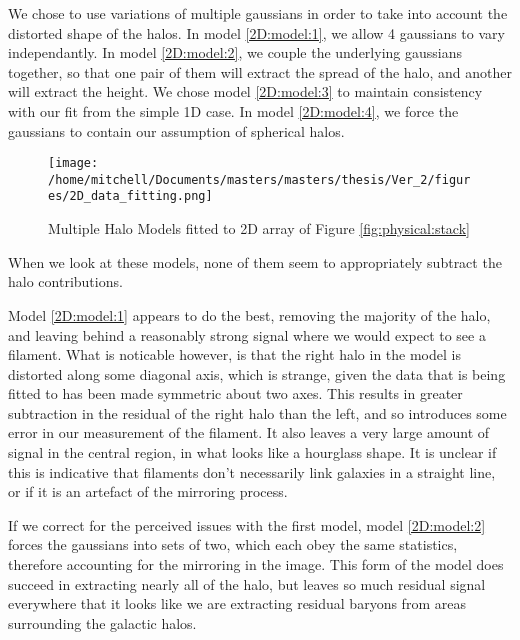 We chose to use variations of multiple gaussians in order to take into account the distorted shape of the halos. In model \ref{2D:model:1}, we allow 4 gaussians to vary independantly. In model \ref{2D:model:2}, we couple the underlying gaussians together, so that one pair of them will extract the spread of the halo, and another will extract the height. We chose model \ref{2D:model:3} to maintain consistency with our fit from the simple 1D case. In model \ref{2D:model:4}, we force the gaussians to contain our assumption of spherical halos. 

\begin{figure}[H]
\centering
\texttt{[image: /home/mitchell/Documents/masters/masters/thesis/Ver\_2/figures/2D\_data\_fitting.png]}
\caption{ Multiple Halo Models fitted to 2D array of Figure \ref{fig:physical:stack} }
\label{fig:halo:2D_complex_model}
\end{figure}

When we look at these models, none of them seem to appropriately subtract the halo contributions. 
\par Model \ref{2D:model:1} appears to do the best, removing the majority of the halo, and leaving behind a reasonably strong signal where we would expect to see a filament. What is noticable however, is that the right halo in the model is distorted along some diagonal axis, which is strange, given the data that is being fitted to has been made symmetric about two axes. This results in greater subtraction in the residual of the right halo than the left, and so introduces some error in our measurement of the filament. It also leaves a very large amount of signal in the central region, in what looks like a hourglass shape. It is unclear if this is indicative that filaments don't necessarily link galaxies in a straight line, or if it is an artefact of the mirroring process.
\par If we correct for the perceived issues with the first model, model \ref{2D:model:2} forces the gaussians into sets of two, which each obey the same statistics, therefore accounting for the mirroring in the image. This form of the model does succeed in extracting nearly all of the halo, but leaves so much residual signal everywhere that it looks like we are extracting residual baryons from areas surrounding the galactic halos. 

